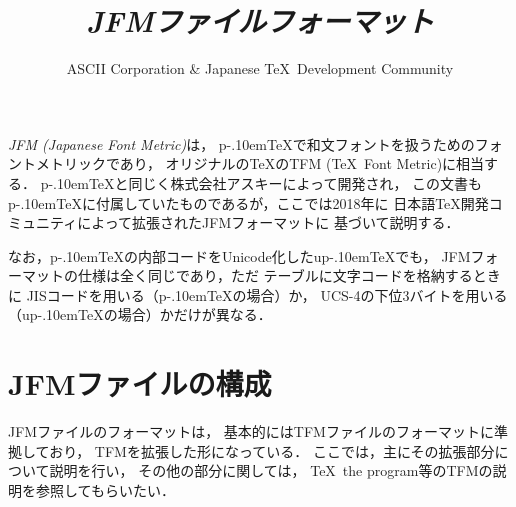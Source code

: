 \documentclass[a4paper,11pt,nomag]{jsarticle}
\title{\emph{JFMファイルフォーマット}}
\author{ASCII Corporation \& Japanese \TeX\ Development Community}
\def\pTeX{p\kern-.10em\TeX}\def\upTeX{u\pTeX}
\begin{document}
\maketitle

\emph{JFM (Japanese Font Metric)}は，
\pTeX で和文フォントを扱うためのフォントメトリックであり，
オリジナルの\TeX のTFM (\TeX\ Font Metric)に相当する．
\pTeX と同じく株式会社アスキーによって開発され，
この文書も\pTeX に付属していたものであるが，ここでは2018年に
日本語\TeX 開発コミュニティによって拡張されたJFMフォーマットに
基づいて説明する．

なお，\pTeX の内部コードをUnicode化した\upTeX でも，
JFMフォーマットの仕様は全く同じであり，ただ
テーブルに文字コードを格納するときに
JISコードを用いる（\pTeX の場合）か，
UCS-4の下位3バイトを用いる（\upTeX の場合）かだけが異なる．

\tableofcontents
\clearpage

\section{JFMファイルの構成}\label{jfm-format}

JFMファイルのフォーマットは，
基本的にはTFMファイルのフォーマットに準拠しており，
TFMを拡張した形になっている．
ここでは，主にその拡張部分について説明を行い，
その他の部分に関しては，
\TeX\ the program等のTFMの説明を参照してもらいたい．
\end{document}
